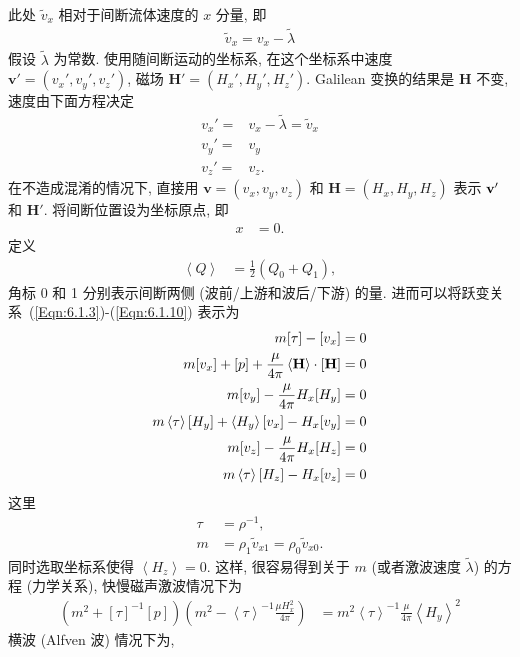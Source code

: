 \documentclass{article}
\begin{document}
此处 $\tilde v_x$ 相对于间断流体速度的 $x$ 分量, 即
\begin{align}
\tilde v_x = v_x - \tilde\lambda
\end{align}
假设 $\tilde\lambda$ 为常数. 使用随间断运动的坐标系,
在这个坐标系中速度 $\boldsymbol{v}' = (v_x', v_y', v_z')$, 磁场 $\boldsymbol{H'} = (H_x', H_y',
H_z')$. Galilean 变换的结果是 $\boldsymbol{H}$ 不变, 速度由下面方程决定
\begin{align*}
v_x' = & v_x - \tilde\lambda = \tilde v_x \\
v_y' = & v_y \\
v_z' = & v_z. 
\end{align*}
在不造成混淆的情况下, 直接用 $\boldsymbol{v} = (v_x, v_y, v_z)$ 和 $\boldsymbol{H} = (H_x, H_y, H_z)$ 表示 ${\bf
v'}$ 和 $\boldsymbol{H}'$. 将间断位置设为坐标原点, 即
\begin{align*}
x &= 0.
\end{align*}
定义
\begin{align*}
\left<Q\right> &= \frac{1}{2}(Q_0 + Q_1),
\end{align*}
角标 0 和 1 分别表示间断两侧 (波前/上游和波后/下游) 的量. 进而可以将跃变关系~(\ref{Eqn:6.1.3})-(\ref{Eqn:6.1.10}) 表示为
\begin{align}
m[\tau] - [v_x] &= 0 \label{Eqn:6.1.4a}
\\
m[v_x] + [p] + \frac{\mu}{4\pi} \left< \bf H \right> \cdot [\bf H ] &=
0\label{Eqn:6.1.5a}
\\
m[v_y] - \frac{\mu}{4\pi} H_x [H_y] &= 0\label{Eqn:6.1.7a}
\\
m \left<\tau \right> [H_y] + \left< H_y \right> [v_x] - H_x [v_y] &= 0\label{Eqn:6.1.8a}
\\
m [v_z] - \frac{\mu}{4\pi} H_x [H_z] &= 0
\\
m \left< \tau \right> [H_z] - H_x [v_z] &= 0\label{Eqn:6.1.10a}
\end{align}
这里 
\begin{align}
  \tau &= \rho^{-1},
  \\
  m &= \rho_1 \tilde v_{x1} = \rho_0 \tilde v_{x0}.
\end{align}
同时选取坐标系使得 $\left< H_z \right> = 0$. 这样, 很容易得到关于 $m$
(或者激波速度 $\tilde\lambda$) 的方程 (力学关系), 快慢磁声激波情况下为
\begin{align}
(m^2 + [\tau]^{-1}[p]) \left( m^2 - \left<\tau\right>^{-1} \frac{\mu H_x^2}{4\pi} \right)
&= m^2 \left<\tau\right>^{-1} \frac{\mu}{4\pi}
\left<H_y\right>^2\label{Eqn:6.1.13}
\end{align}
横波 (Alfven 波) 情况下为,
\end{document}
